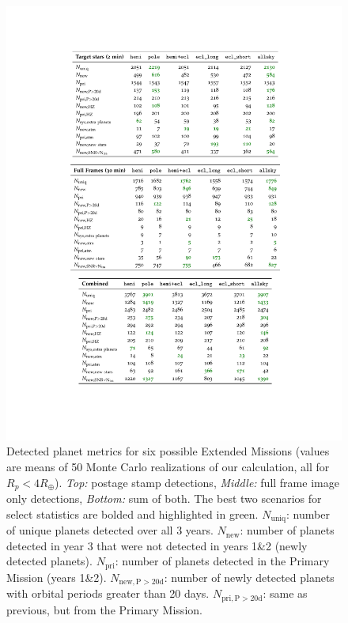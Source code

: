 \begin{figure}[!t]
	\centering
	\includegraphics[scale=2.]{tables/cropped_tables_vis.pdf}
	\caption{Detected planet metrics for six possible Extended Missions (values are means of 50 Monte Carlo realizations of our calculation, all for $R_p<4R_\oplus$).
	\textit{Top:} postage stamp detections, \textit{Middle:} full frame image only detections, \textit{Bottom:} sum of both.
	The best two scenarios for select statistics are bolded and highlighted in 
	green.
	\newline
	$N_\mathrm{uniq}$: number of unique planets detected over all 3 years.
	$N_\mathrm{new}$: number of planets detected in year 3 that were not detected in years 1\&2 (newly detected planets).
	$N_\mathrm{pri}$: number of planets detected in the Primary Mission (years 1\&2).
	$N_\mathrm{new,P>20d}$: number of newly detected planets with orbital periods greater than 20 days.
	$N_\mathrm{pri,P>20d}$: same as previous, but from the Primary Mission.
}
\end{figure}
